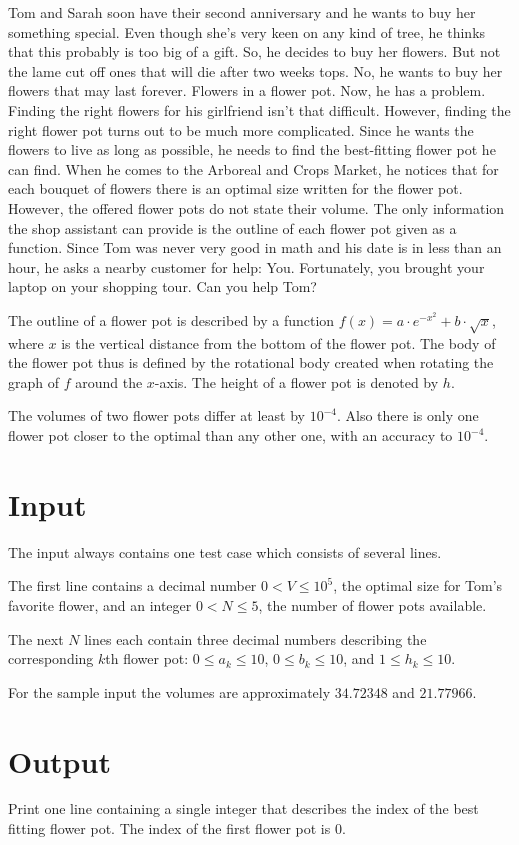 
Tom and Sarah soon have their second anniversary and he wants to buy her something special. Even though she's very keen on any kind of tree, he thinks that this probably is too big of a gift. So, he decides to buy her flowers. But not the lame cut off ones that will die after two weeks tops. No, he wants to buy her flowers that may last forever. Flowers in a flower pot. 
Now, he has a problem. Finding the right flowers for his girlfriend isn't that difficult. However, finding the right flower pot turns out to be much more complicated. Since he wants the flowers to live as long as possible, he needs to find the best-fitting flower pot he can find.
When he comes to the Arboreal and Crops Market, he notices that for each bouquet of flowers there is an optimal size written for the flower pot. However, the offered flower pots do not state their volume. The only information the shop assistant can provide is the outline of each flower pot given as a function. Since Tom was never very good in math and his date is in less than an hour, he asks a nearby customer for help: You. Fortunately, you brought your laptop on your shopping tour. Can you help Tom?

\vspace{1em}

The outline of a flower pot is described by a function $f(x) = a \cdot e^{-x^2} + b \cdot \sqrt{x}$, where $x$ is the vertical distance from the bottom of the flower pot. The body of the flower pot thus is defined by the rotational body created when rotating the graph of $f$ around the $x$-axis. The height of a flower pot is denoted by $h$.

The volumes of two flower pots differ at least by $10^{-4}$. Also there is only one flower pot closer to the optimal than any other one, with an accuracy to $10^{-4}$.

\section*{Input}
The input always contains one test case which consists of several lines.

The first line contains a decimal number $0 < V \le 10^5$, the optimal size for Tom's favorite flower, and an integer $0 < N \le 5$, the number of flower pots available.

The next $N$ lines each contain three decimal numbers describing the corresponding $k$th flower pot: $0 \le a_k \le 10$, $0 \le b_k \le 10$, and $1 \le h_k \le 10$.

For the sample input the volumes are approximately $34.72348$ and $21.77966$.

\section*{Output}
Print one line containing a single integer that describes the index of the best fitting flower pot. The index of the first flower pot is $0$.
